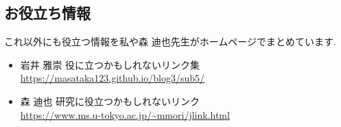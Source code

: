 \subsection{お役立ち情報}
これ以外にも役立つ情報を私や森 迪也先生がホームページでまとめています. 

\vspace{-8pt} 
\begin{itemize}[left=0pt]
  \setlength{\parskip}{0cm} %
  \setlength{\itemsep}{0cm} %
\item 岩井 雅崇 役に立つかもしれないリンク集 \\ 
\url{https://masataka123.github.io/blog3/sub5/}
\item 森 迪也 研究に役立つかもしれないリンク \\ \url{https://www.ms.u-tokyo.ac.jp/~mmori/jlink.html}
\end{itemize}

